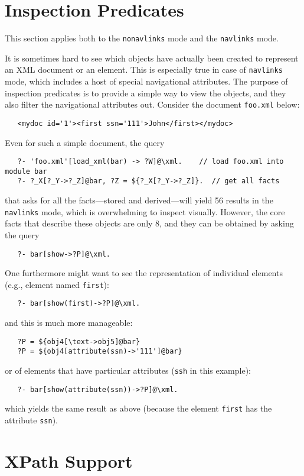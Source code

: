 \section{Inspection Predicates}

This section applies both to the \texttt{nonavlinks} mode and the
\texttt{navlinks} mode.  

It is sometimes hard to see which objects have actually been created to
represent an XML document or an element. This is especially true in case of
\texttt{navlinks} mode, which includes a host of special navigational
attributes. 
The purpose of inspection predicates is to provide a simple way to view the
objects, and they also filter the navigational attributes out.
Consider the document \texttt{foo.xml} below: 
\begin{verbatim}
   <mydoc id='1'><first ssn='111'>John</first></mydoc>
\end{verbatim}
Even for such a simple document, the query
\begin{verbatim}
   ?- 'foo.xml'[load_xml(bar) -> ?W]@\xml.    // load foo.xml into module bar
   ?- ?_X[?_Y->?_Z]@bar, ?Z = ${?_X[?_Y->?_Z]}.  // get all facts
\end{verbatim}
that asks for all the facts---stored and derived---will yield 56 results in
the \texttt{navlinks} mode,
which is overwhelming to inspect visually. However, the core facts that
describe these objects are only 8, and they can be obtained by asking the
query
\begin{verbatim}
   ?- bar[show->?P]@\xml.
\end{verbatim}
One furthermore might want to see the representation of individual 
elements (e.g., element named \texttt{first}):
\begin{verbatim}
   ?- bar[show(first)->?P]@\xml.
\end{verbatim}
and this is much more manageable:
\begin{verbatim}
   ?P = ${obj4[\text->obj5]@bar}
   ?P = ${obj4[attribute(ssn)->'111']@bar}
\end{verbatim}
or of elements that have particular attributes (\texttt{ssh} in this
example): 
\begin{verbatim}
   ?- bar[show(attribute(ssn))->?P]@\xml.
\end{verbatim}
which yields the same result as above (because the element \texttt{first}
has the attribute \texttt{ssn}).  


\section{XPath Support}

